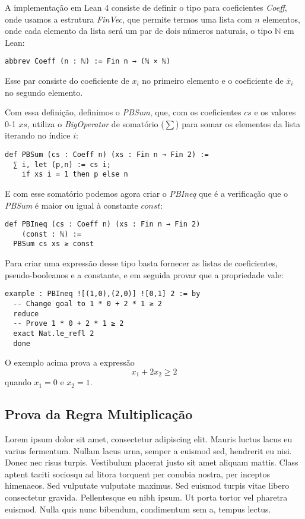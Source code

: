 \documentclass[conference]{IEEEtran}
\begin{document}
A implementação em Lean 4 consiste de definir o tipo para coeficientes \textit{Coeff}, onde usamos a estrutura
\textit{FinVec}, que permite termos uma lista com $n$ elementos, onde cada elemento da lista será um par
de dois números naturais, o tipo $\mathbb{N}$ em Lean:
\begin{verbatim}
abbrev Coeff (n : ℕ) := Fin n → (ℕ × ℕ)
\end{verbatim}

Esse par consiste do coeficiente de $x_i$ no primeiro elemento e
o coeficiente de $\overline x_i$ no segundo elemento.

Com essa definição, definimos o \textit{PBSum}, que, com os coeficientes $cs$ e os valores 0-1 $xs$,
utiliza o \textit{BigOperator} de somatório ($\sum$) para somar os elementos da lista iterando no índice $i$:
\begin{verbatim}
def PBSum (cs : Coeff n) (xs : Fin n → Fin 2) :=
  ∑ i, let (p,n) := cs i;
    if xs i = 1 then p else n
\end{verbatim}

E com esse somatório podemos agora criar o \textit{PBIneq} que é a verificação que o \textit{PBSum}
é maior ou igual à constante $const$:
\begin{verbatim}
def PBIneq (cs : Coeff n) (xs : Fin n → Fin 2)
    (const : ℕ) :=
  PBSum cs xs ≥ const
\end{verbatim}

Para criar uma expressão desse tipo basta fornecer as listas de coeficientes, pseudo-booleanos e a constante,
e em seguida provar que a propriedade vale:
\begin{verbatim}
example : PBIneq ![(1,0),(2,0)] ![0,1] 2 := by
  -- Change goal to 1 * 0 + 2 * 1 ≥ 2
  reduce               
  -- Prove 1 * 0 + 2 * 1 ≥ 2
  exact Nat.le_refl 2  
  done
\end{verbatim}

O exemplo acima prova a expressão
\begin{equation}
    x_1 + 2 x_2 \ge 2
\end{equation}
quando $x_1 = 0$ e $x_2 = 1$.


\subsection{Prova da Regra Multiplicação}
Lorem ipsum dolor sit amet, consectetur adipiscing elit. Mauris luctus lacus eu varius fermentum. Nullam lacus urna, semper a euismod sed, hendrerit eu nisi. Donec nec risus turpis. Vestibulum placerat justo sit amet aliquam mattis. Class aptent taciti sociosqu ad litora torquent per conubia nostra, per inceptos himenaeos. Sed vulputate vulputate maximus. Sed euismod turpis vitae libero consectetur gravida. Pellentesque eu nibh ipsum. Ut porta tortor vel pharetra euismod. Nulla quis nunc bibendum, condimentum sem a, tempus lectus.
\end{document}
